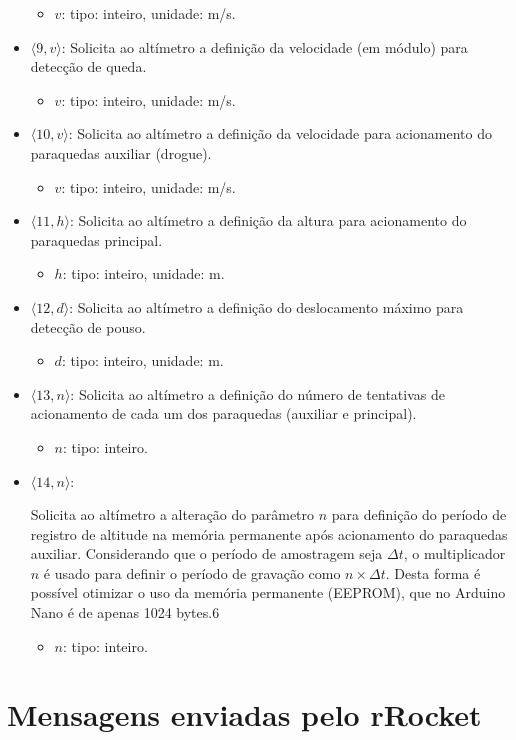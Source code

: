 \documentclass[portuguese,10pt,a4paper]{article}
\newcommand{\nexplanation}{definição do período de registro de altitude na memória permanente após acionamento do paraquedas auxiliar. Considerando que o período de amostragem seja $\Delta t$, o multiplicador $n$ é usado para definir o período de gravação como $n \times \Delta t$. Desta forma é possível otimizar o uso da memória permanente (EEPROM), que no Arduino Nano é de apenas 1024 bytes.}
\begin{document}
\begin{itemize}
	\begin{itemize}
		\item $v$: tipo: inteiro, unidade: m/s.  
	\end{itemize}
	\item $\langle 9, v\rangle$:
	Solicita ao altímetro a definição da velocidade (em módulo) para detecção de queda.
	\begin{itemize}
		\item $v$: tipo: inteiro, unidade: m/s.  
	\end{itemize}
	\item $\langle 10, v\rangle$:
	Solicita ao altímetro a definição da velocidade para acionamento do paraquedas auxiliar (drogue).
	\begin{itemize}
		\item $v$: tipo: inteiro, unidade: m/s.  
	\end{itemize}
	\item $\langle 11, h\rangle$: 
	Solicita ao altímetro a definição da altura para acionamento do paraquedas principal.
	\begin{itemize}
		\item $h$: tipo: inteiro, unidade: m.  
	\end{itemize}
	\item $\langle 12, d\rangle$:
	Solicita ao altímetro a definição do deslocamento máximo para detecção de pouso.
	\begin{itemize}
		\item $d$: tipo: inteiro, unidade: m.  
	\end{itemize}
	\item $\langle 13, n\rangle$:
	Solicita ao altímetro a definição do número de tentativas de acionamento de cada um dos paraquedas (auxiliar e principal).
	\begin{itemize}
		\item $n$: tipo: inteiro.  
	\end{itemize}
	\item $\langle 14, n\rangle$: 
		
	
	Solicita ao altímetro a alteração do parâmetro $n$ para \nexplanation6
	\begin{itemize}
		\item $n$: tipo: inteiro.  
	\end{itemize}
\end{itemize}

\section{Mensagens enviadas pelo rRocket}
\end{document}
